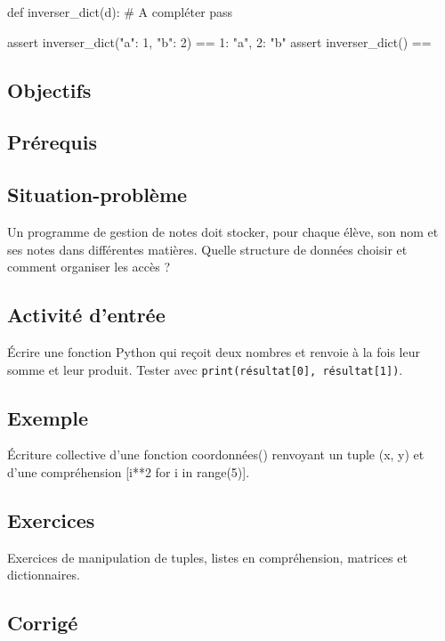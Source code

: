 \begin{python}
def inverser_dict(d):
    # A compléter
    pass

assert inverser_dict({"a": 1, "b": 2}) == {1: "a", 2: "b"}
assert inverser_dict({}) == {}
\end{python}

\subsection{Objectifs}

\subsection{Prérequis}

\subsection{Situation-problème}

Un programme de gestion de notes doit stocker, pour chaque élève, son
nom et ses notes dans différentes matières. Quelle structure de données
choisir et comment organiser les accès ?

\subsection{Activité d’entrée}

Écrire une fonction Python qui reçoit deux nombres et renvoie à la fois
leur somme et leur produit. Tester avec \lstinline|print(résultat[0], résultat[1])|.

\subsection{Exemple}

Écriture collective d'une fonction coordonnées() renvoyant un tuple (x,
y) et d'une compréhension {[}i**2 for i in range(5){]}.

\subsection{Exercices}

Exercices de manipulation de tuples, listes en compréhension, matrices
et dictionnaires.

\subsection{Corrigé}

